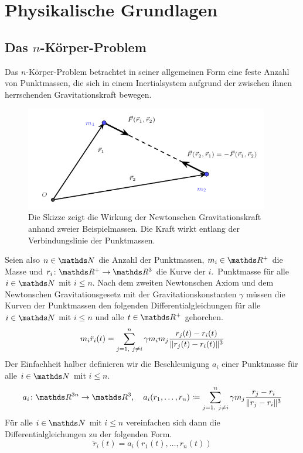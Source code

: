 \section{Physikalische Grundlagen} %
\label{sec:grundlagen}

  \subsection{Das $n$-Körper-Problem} %
  \label{sub:das_n_koerper_problem}

    Das $n$-Körper-Problem betrachtet in seiner allgemeinen Form eine feste Anzahl von Punktmassen, die sich in einem Inertialsystem aufgrund der zwischen ihnen herrschenden Gravitationskraft bewegen.

    \begin{figure}[h]
      \center
      \includegraphics[width=0.95\textwidth]{pictures/gravitational_force.pdf}
      \caption{Die Skizze zeigt die Wirkung der Newtonschen Gravitationskraft anhand zweier Beispielmassen. Die Kraft wirkt entlang der Verbindungslinie der Punktmassen.}
    \end{figure}

    Seien also $n\in\setNatural$ die Anzahl der Punktmassen, $m_i\in\setReal^+$ die Masse und $\function{r_i}{\setReal^+}{\setReal^3}$ die Kurve der $i.$~Punktmasse für alle $i\in\setNatural$ mit $i\leq n$.
    Nach dem zweiten Newtonschen Axiom und dem Newtonschen Gravitationsgesetz mit der Gravitationskonstanten $\gamma$ müssen die Kurven der Punktmassen den folgenden Differentialgleichungen  für alle $i\in\setNatural$ mit $i\leq n$ und alle $t\in\setReal^+$ gehorchen.
    \[
      m_i\ddot{r}_i(t) = \sum_{{j=1,\ j\neq i}}^n \gamma m_im_j \frac{r_j(t)-r_i(t)}{\|r_j(t)-r_i(t)\|^3}
    \]
    Der Einfachheit halber definieren wir die Beschleunigung $a_i$ einer Punktmasse für alle $i\in\setNatural$ mit $i\leq n$.
    \[
      \function{a_i}{\setReal^{3n}}{\setReal^3}
      \separate
      a_i(r_1,\ldots,r_n)\define \sum_{{j=1,\ j\neq i}}^n \gamma m_j \frac{r_j-r_i}{\norm{r_j-r_i}^3}
    \]
    Für alle $i\in\setNatural$ mit $i\leq n$ vereinfachen sich dann die Differentialgleichungen zu der folgenden Form.
    \[
      \ddot{r}_i(t) = a_i(r_1(t),\ldots,r_n(t))
    \]

